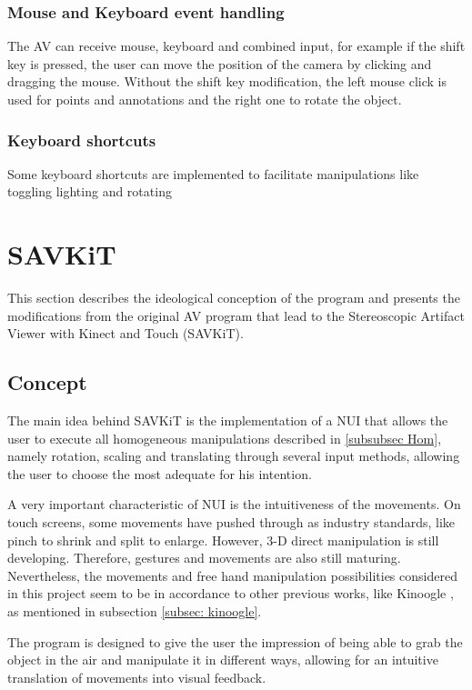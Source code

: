 \documentclass[12pt]{extarticle}
\begin{document}
	\subsubsection { Mouse and Keyboard event handling}
	The AV can receive mouse, keyboard and combined input, for example if the shift key is pressed, the user can move the position of the camera by clicking and dragging the mouse. Without the shift key modification, the left mouse click is used for points and annotations and the right one to rotate the object.
	\subsubsection { Keyboard shortcuts}
	Some keyboard shortcuts are implemented to facilitate manipulations like toggling lighting and rotating
	
\section{SAVKiT}\label{sec:Sav}
This section describes the ideological conception of the program and presents the modifications from the original AV program that lead to the Stereoscopic Artifact Viewer with Kinect and Touch (SAVKiT).

\subsection {Concept}
The main idea behind SAVKiT is the implementation of a NUI that allows the user to execute all homogeneous manipulations described in \ref{subsubsec Hom}, namely rotation, scaling and translating through several input methods, allowing the user to choose the most adequate for his intention.

A very important characteristic of NUI is the intuitiveness of the movements. On touch screens, some movements have pushed through as industry standards, like pinch to shrink and split to enlarge. However, 3-D direct manipulation is still developing. Therefore, gestures and movements are also still maturing. Nevertheless, the movements and free hand manipulation possibilities considered in this project seem to be in accordance to other previous works, like Kinoogle \cite{Kinoogle}, as mentioned in subsection \ref{subsec: kinoogle}.

The program is designed to give the user the impression of being able to grab the object in the air and manipulate it in different ways, allowing for an intuitive translation of movements into visual feedback.
\end{document}
